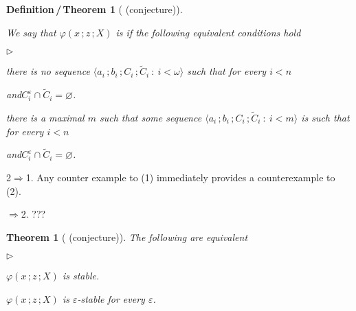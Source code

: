 \documentclass{amsproc}
\makeatletter
\newcommand{\mylabel}[1]{{#1}\hfill}
\renewenvironment{itemize}
  {\begin{list}{$\triangleright$}{%
  \setlength{\parskip}{0mm}
  \setlength{\topsep}{.1\baselineskip}
  \setlength{\rightmargin}{0mm}
  \setlength{\listparindent}{0mm}
  \setlength{\itemindent}{0mm}
  \setlength{\labelwidth}{3ex}
  \setlength{\itemsep}{.1\baselineskip}
  \setlength{\parsep}{.1\baselineskip}
  \setlength{\partopsep}{0mm}
  \setlength{\labelsep}{1ex}
  \setlength{\leftmargin}{\labelwidth+\labelsep}
  \let\makelabel\mylabel}}{%
\end{list}}
\newcounter{thm}
\theoremstyle{mio}
\newtheorem{theorem}[thm]{Theorem}\tcolorboxenvironment{theorem}{mythm}
\newtheorem{definition_theorem}[thm]{Definition\,/\,Theorem}\tcolorboxenvironment{definition_theorem}{mythm}
\providecommand{\proofNameStyle}{\bfseries}
\renewenvironment{proof}[1][\proofname]{\par
  \pushQED{\qed}%
  \normalfont%
  \trivlist
  \item[\hskip\labelsep
        \proofNameStyle
    #1\@addpunct{.}]\ignorespaces
}{%
  \popQED\endtrivlist\@endpefalse
}
\renewcommand*{\emph}[1]{%
   \smash{\tikz[baseline]\node[rectangle, fill=teal!25, rounded corners, inner xsep=0.5ex, inner ysep=0.2ex, anchor=base, minimum height = 2.7ex]{\strut #1};}}
\makeatother
\begin{document}
\begin{definition_theorem}[ (conjecture)]\label{defthm_epsilon_stable}\strut
  We say that $\varphi(x\,;z\,;X)$ is \emph{$\varepsilon$-stable\/} if the following equivalent conditions hold\smallskip
  
  \begin{itemize}
    \item [1.]  there is no sequence $\langle a_i\,;b_i\,;C_i\,;\tilde C_i\ :\ i<\omega\rangle$ such that for every $i<n$\smallskip
  
    \quad and\quad $C_i^\varepsilon\cap\tilde C_i=\varnothing$.\smallskip

    \item [2.]  there is a maximal $m$ such that some sequence $\langle a_i\,;b_i\,;C_i\,;\tilde C_i\ :\ i<m\rangle$ is such that for every $i<n$

    \quad and\quad $C_i^\varepsilon\cap\tilde C_i=\varnothing$.\smallskip    
  \end{itemize}
\end{definition_theorem}

\begin{proof}
  2$\Rightarrow$1. Any counter example to (1) immediately provides a counterexample to (2).

  
  \noindent\llap{\textcolor{red}{\Large\warning}\kern1.5ex}$\Rightarrow$2. ???
\end{proof}

\begin{theorem}[ (conjecture)]\label{thm_epsilon_stable}
  The following are equivalent\smallskip
  \begin{itemize}
    \item [1.] $\varphi(x\,;z\,;X)$ is stable.
    \item [2.] $\varphi(x\,;z\,;X)$ is $\varepsilon$-stable for every $\varepsilon$.
  \end{itemize}
\end{theorem}
\end{document}

